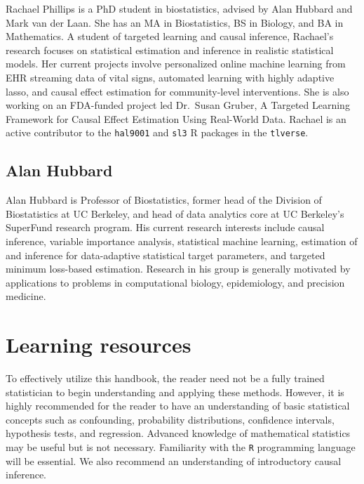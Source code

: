 \documentclass[
  12pt, krantz2,
]{krantz}
\newcommand{\passthrough}[1]{#1}
\theoremstyle{definition}
\theoremstyle{definition}
\theoremstyle{definition}
\newcommand{\1}{\mathbbm{1}}
\begin{document}
Rachael Phillips is a PhD student in biostatistics, advised by Alan Hubbard and
Mark van der Laan. She has an MA in Biostatistics, BS in Biology, and BA in
Mathematics. A student of targeted learning and causal inference, Rachael's
research focuses on statistical estimation and inference in realistic
statistical models. Her current projects involve personalized online machine
learning from EHR streaming data of vital signs, automated learning with
highly adaptive lasso, and causal effect estimation for community-level
interventions. She is also working on an FDA-funded project led Dr.~Susan
Gruber, A Targeted Learning Framework for Causal Effect Estimation Using
Real-World Data. Rachael is an active contributor to the \passthrough{\lstinline!hal9001!} and \passthrough{\lstinline!sl3!}
R packages in the \passthrough{\lstinline!tlverse!}.

\hypertarget{alan-hubbard}{%
\subsection*{Alan Hubbard}\label{alan-hubbard}}


Alan Hubbard is Professor of Biostatistics, former head of the Division of
Biostatistics at UC Berkeley, and head of data analytics core at UC Berkeley's
SuperFund research program. His current research interests include causal
inference, variable importance analysis, statistical machine learning,
estimation of and inference for data-adaptive statistical target parameters, and
targeted minimum loss-based estimation. Research in his group is generally
motivated by applications to problems in computational biology, epidemiology,
and precision medicine.

\hypertarget{learn}{%
\section{Learning resources}\label{learn}}

To effectively utilize this handbook, the reader need not be a fully trained
statistician to begin understanding and applying these methods. However, it is
highly recommended for the reader to have an understanding of basic statistical
concepts such as confounding, probability distributions, confidence intervals,
hypothesis tests, and regression. Advanced knowledge of mathematical statistics
may be useful but is not necessary. Familiarity with the \passthrough{\lstinline!R!} programming
language will be essential. We also recommend an understanding of introductory
causal inference.
\end{document}
